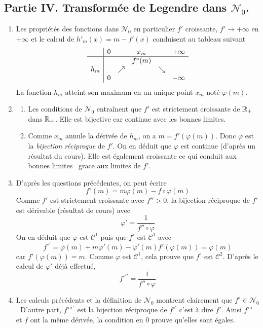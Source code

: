 \subsection*{Partie IV. Transformée de Legendre dans $\mathcal{N}_0$.}
\begin{enumerate}
\item Les propriétés des fonctions dans $\mathcal{N}_0$  en particulier $f'$ croissante, $f'\rightarrow +\infty$ en $+\infty$ et le calcul de $h'_m(x)=m-f'(x)$ conduisent au tableau suivant
\[
\begin{array}{c|ccccc}
& 0 &  & x_m &  & +\infty  \\
\hline
&  &  & f^{\circ}(m) &  &  \\
h_{m} &  & \nearrow  &  & \searrow  &  \\
& 0 &  &  &  & -\infty
\end{array}
\]
La fonction $h_m$ atteint son maximum en un unique point $x_m$ noté $\varphi(m)$.
\item \begin{enumerate}
\item Les conditions de $\mathcal{N}_0$ entraînent que $f'$ est strictement croissante de $\mathbb{R}_+$ dans $\mathbb{R}_+$. Elle est bijective car continue avec les \og bonnes limites\fg.
\item Comme $x_m$ annule la dérivée de $h_m$, on a $m=f'(\varphi(m))$. Donc $\varphi$ est la \emph{bijection réciproque} de $f'$. On en déduit que $\varphi$ est continue (d'après un résultat du cours). Elle est également croissante ce qui conduit aux \og bonnes limites\fg~ grace aux limites de $f'$.
      \end{enumerate}
 \item D'après les questions précédentes, on peut écrire
 \[f^{\circ}(m)=m\varphi(m)-f\circ\varphi(m)\]
 Comme $f'$ est strictement croissante avec $f''>0$, la bijection réciproque de $f'$ est dérivable (résultat de cours) avec
 \[\varphi'=\frac{1}{f''\circ \varphi}\]
 On en déduit que $\varphi$ est $\mathcal{C}^1$ puis que $f^\circ$ est $\mathcal{C}^1$ avec
 \[f^{\circ\prime}=\varphi(m)+m\varphi'(m)-\varphi'(m)f'(\varphi(m))=\varphi(m)\]
 car $f'(\varphi(m))=m$. Comme $\varphi$ est $\mathcal{C}^1$, cela prouve que $f^\circ$ est $\mathcal{C}^2$. D'après le calcul de $\varphi'$ déjà effectué,
 \[f^{\circ\prime \prime}=\frac{1}{f''\circ \varphi}\]
 \item Les calculs précédents et la définition de $\mathcal{N}_0$ montrent clairement que $f^\circ \in \mathcal{N}_0$. D'autre part, $f^{\circ\circ\prime}$ est la bijection réciproque de $f^{\circ\prime}$ c'est à dire $f'$. Ainsi $f^{\circ\circ}$ et $f$ ont la même dérivée, la condition en 0 prouve qu'elles sont égales.
\end{enumerate}

